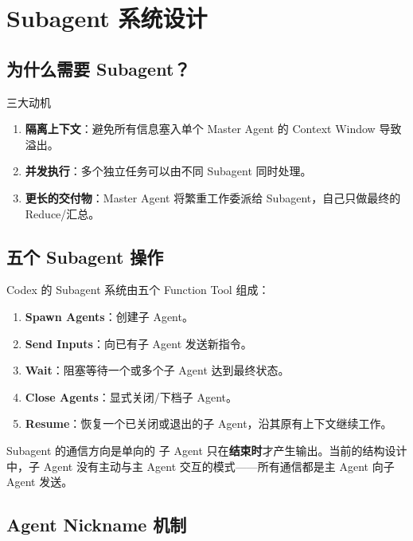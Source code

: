 \section{Subagent 系统设计}

\subsection{为什么需要 Subagent？}

\begin{importantbox}{三大动机}
\begin{enumerate}
    \item \textbf{隔离上下文}：避免所有信息塞入单个 Master Agent 的 Context Window 导致溢出。
    \item \textbf{并发执行}：多个独立任务可以由不同 Subagent 同时处理。
    \item \textbf{更长的交付物}：Master Agent 将繁重工作委派给 Subagent，自己只做最终的 Reduce/汇总。
\end{enumerate}
\end{importantbox}

\subsection{五个 Subagent 操作}

Codex 的 Subagent 系统由五个 Function Tool 组成：

\begin{enumerate}
    \item \textbf{Spawn Agents}：创建子 Agent。
    \item \textbf{Send Inputs}：向已有子 Agent 发送新指令。
    \item \textbf{Wait}：阻塞等待一个或多个子 Agent 达到最终状态。
    \item \textbf{Close Agents}：显式关闭/下档子 Agent。
    \item \textbf{Resume}：恢复一个已关闭或退出的子 Agent，沿其原有上下文继续工作。
\end{enumerate}

\begin{warningbox}{Subagent 的通信方向是单向的}
子 Agent 只在\textbf{结束时}才产生输出。当前的结构设计中，子 Agent 没有主动与主 Agent 交互的模式——所有通信都是主 Agent 向子 Agent 发送。
\end{warningbox}

\subsection{Agent Nickname 机制}

